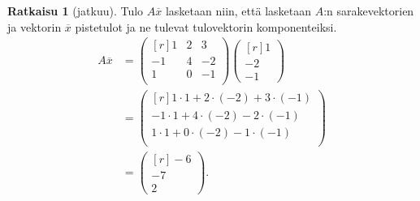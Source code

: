 \documentclass[12pt, a4paper, t]{beamer}
\theoremstyle{exercise}
\theoremstyle{remark}
\theoremstyle{definition}
\renewcommand{\bar}[1]{\overline{#1}}
\newtheorem*{rat}{Ratkaisu}
\begin{document}
\begin{frame}
\vspace{100pt}
\begin{rat}[jatkuu]
Tulo $A\bar{x}$ lasketaan niin, että lasketaan $A$:n sarakevektorien ja vektorin $\bar{x}$ pistetulot ja ne tulevat tulovektorin komponenteiksi.
\begin{align*}
A\bar{x}&=\begin{pmatrix*}[r]
1 & 2 & 3\\
-1 & 4 & -2\\
1 & 0&-1\\
\end{pmatrix*}\begin{pmatrix*}[r]
1\\
-2\\
-1
\end{pmatrix*}\\
&=\begin{pmatrix*}[r]
1\cdot 1+2\cdot(-2)+3\cdot(-1)\\
-1 \cdot 1+	4\cdot (-2)-2\cdot(-1)\\
1 \cdot 1+0\cdot(-2)-1\cdot(-1)\\
\end{pmatrix*}\\
&=\begin{pmatrix*}[r]
-6\\
-7\\
2
\end{pmatrix*}.\\
\end{align*}

\end{rat}

\end{frame}
\end{document}
